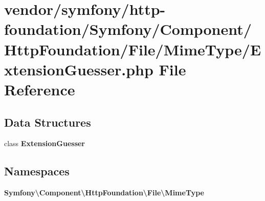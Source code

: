 \section{vendor/symfony/http-\/foundation/\+Symfony/\+Component/\+Http\+Foundation/\+File/\+Mime\+Type/\+Extension\+Guesser.php File Reference}
\label{_extension_guesser_8php}
\subsection*{Data Structures}
\begin{DoxyCompactItemize}
\item 
class {\bf Extension\+Guesser}
\end{DoxyCompactItemize}
\subsection*{Namespaces}
\begin{DoxyCompactItemize}
\item 
 {\bf Symfony\textbackslash{}\+Component\textbackslash{}\+Http\+Foundation\textbackslash{}\+File\textbackslash{}\+Mime\+Type}
\end{DoxyCompactItemize}
